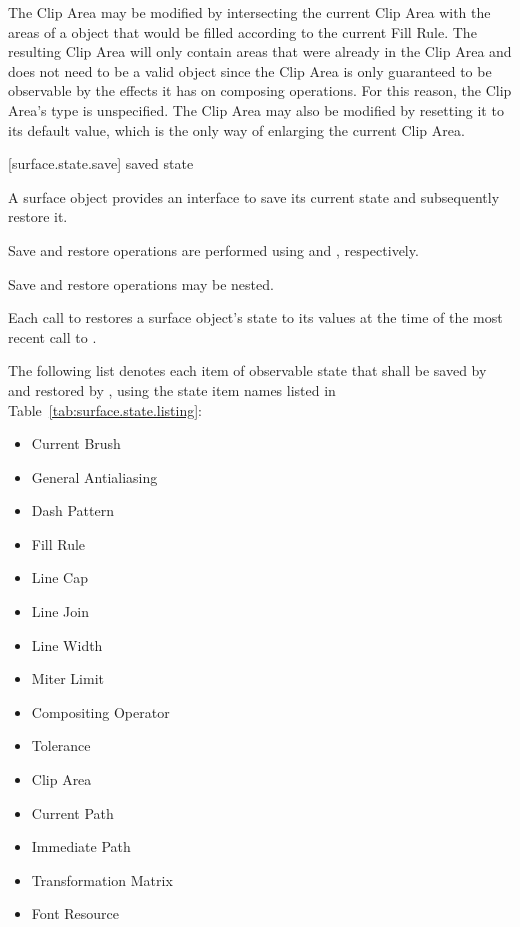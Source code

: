 \pnum
\enternote
The Clip Area may be modified by intersecting the current Clip Area with the areas of a  object that would be filled according to the current Fill Rule. The resulting Clip Area will only contain areas that were already in the Clip Area and does not need to be a valid  object since the Clip Area is only guaranteed to be observable by the effects it has on composing operations. For this reason, the Clip Area's type is unspecified. The Clip Area may also be modified by resetting it to its default value, which is the only way of enlarging the current Clip Area.
\exitnote

 [surface.state.save] { saved state}

\pnum
A surface object provides an interface to save its current state and subsequently restore it.

\pnum
Save and restore operations are performed using  and , respectively.

\pnum
Save and restore operations may be nested.

\pnum
Each call to  restores a surface object's state to its values at the time of the most recent call to .

\pnum
The following list denotes each item of observable state that shall be saved by  and restored by , using the state item names listed in Table~\ref{tab:surface.state.listing}:

\begin{itemize}
	\item Current Brush
	\item General Antialiasing
	\item Dash Pattern
	\item Fill Rule
	\item Line Cap
	\item Line Join
	\item Line Width
	\item Miter Limit
	\item Compositing Operator
	\item Tolerance
	\item Clip Area
	\item Current Path
	\item Immediate Path
	\item Transformation Matrix
	\item Font Resource
\end{itemize}

